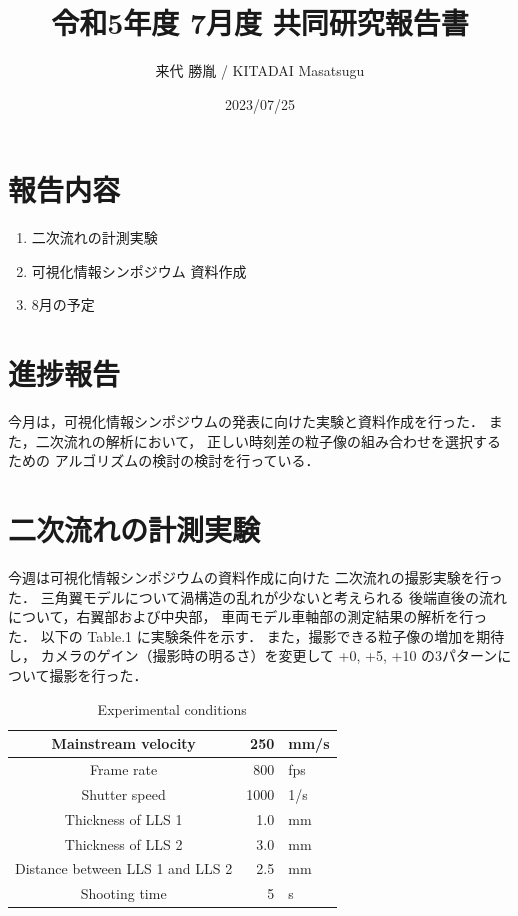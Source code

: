 \documentclass[twocolumn,a4j]{jsarticle}
\author{来代 勝胤 / KITADAI Masatsugu}
\title{令和5年度 7月度 共同研究報告書}
\date{2023/07/25}
\begin{document}
\columnseprule=0.1mm
\maketitle

\section*{報告内容}
\begin{enumerate}[1.]
  \item 二次流れの計測実験
  \item 可視化情報シンポジウム 資料作成
  \item 8月の予定
\end{enumerate}

\section*{進捗報告}
今月は，可視化情報シンポジウムの発表に向けた実験と資料作成を行った．
また，二次流れの解析において，
正しい時刻差の粒子像の組み合わせを選択するための
アルゴリズムの検討の検討を行っている．

\section{二次流れの計測実験}

今週は可視化情報シンポジウムの資料作成に向けた
二次流れの撮影実験を行った．
三角翼モデルについて渦構造の乱れが少ないと考えられる
後端直後の流れについて，右翼部および中央部，
車両モデル車軸部の測定結果の解析を行った．
以下の Table.1 に実験条件を示す．
また，撮影できる粒子像の増加を期待し，
カメラのゲイン（撮影時の明るさ）を変更して
+0, +5, +10 の3パターンについて撮影を行った．

\begin{table}[hbtp]
  \centering
  \caption{Experimental conditions}
  \begin{tabular}{ c r l }
    \hline
    Mainstream velocity              & 250  & mm/s \\ \hline
    Frame rate                       & 800  & fps  \\ \hline
    Shutter speed                    & 1000 & 1/s  \\ \hline
    Thickness of LLS 1               & 1.0  & mm   \\ \hline
    Thickness of LLS 2               & 3.0  & mm   \\ \hline
    Distance between LLS 1 and LLS 2 & 2.5  & mm   \\ \hline
    Shooting time                    & 5    & s    \\ \hline
  \end{tabular}
\end{table}
\end{document}
